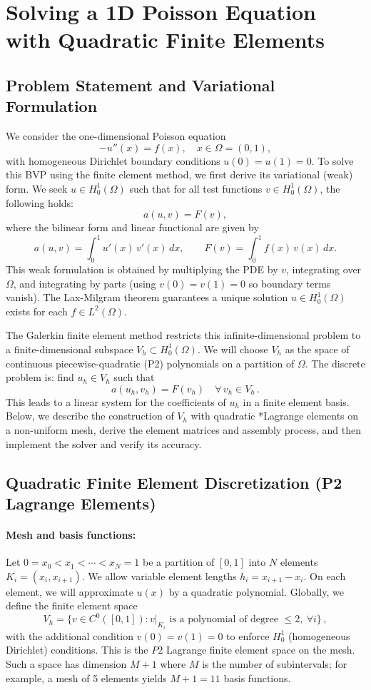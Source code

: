 \documentclass[a4paper,10pt]{article}
\begin{document}

\clearpage


\section{Solving a 1D Poisson Equation with Quadratic Finite Elements}

\subsection{Problem Statement and Variational Formulation}

We consider the one-dimensional Poisson equation
$$ 
-u''(x) = f(x), \quad x \in \Omega=(0,1), 
$$
with homogeneous Dirichlet boundary conditions $u(0)=u(1)=0$. 
To solve this BVP using the finite element method, we first derive its variational (weak) form. 
We seek $u \in H^1_0(\Omega)$ such that for all test functions $v \in H^1_0(\Omega)$, the following holds:
$$ 
a(u,v) = F(v), 
$$
where the bilinear form and linear functional are given by
$$ 
a(u,v) = \int_0^1 u'(x)\,v'(x)\,dx, \qquad F(v) = \int_0^1 f(x)\,v(x)\,dx. 
$$
This weak formulation is obtained by multiplying the PDE by $v$, integrating over $\Omega$, and integrating by parts (using $v(0)=v(1)=0$ so boundary terms vanish). The Lax-Milgram theorem guarantees a unique solution $u \in H^1_0(\Omega)$ exists for each $f\in L^2(\Omega)$.

The Galerkin finite element method restricts this infinite-dimensional problem to a finite-dimensional subspace $V_h \subset H^1_0(\Omega)$. We will choose $V_h$ as the space of continuous piecewise-quadratic (P2) polynomials on a partition of $\Omega$. The discrete problem is: find $u_h \in V_h$ such that
\[
a(u_h, v_h) = F(v_h) \quad \forall\, v_h \in V_h\,.\tag{*}
\]
This leads to a linear system for the coefficients of $u_h$ in a finite element basis. Below, we describe the construction of $V_h$ with quadratic *Lagrange\* elements on a non-uniform mesh, derive the element matrices and assembly process, and then implement the solver and verify its accuracy.

\subsection{Quadratic Finite Element Discretization (P2 Lagrange Elements)}

\paragraph{Mesh and basis functions:} 
Let $0 = x_0 < x_1 < \cdots < x_N = 1$ be a partition of $[0,1]$ into $N$ elements $K_i = (x_i, x_{i+1})$. 
We allow variable element lengths $h_i = x_{i+1}-x_i$. On each element, we will approximate $u(x)$ by a quadratic polynomial. Globally, we define the finite element space
$$ 
V_h = \{ v \in C^0([0,1]) : v|_{K_i} \text{ is a polynomial of degree }\le 2,\ \forall i\}\,, 
$$
with the additional condition $v(0)=v(1)=0$ to enforce $H^1_0$ (homogeneous Dirichlet) conditions.
This is the $P2$ Lagrange finite element space on the mesh. Such a space has dimension $M+1$ where $M$ is the number of subintervals; for example, a mesh of 5 elements yields $M+1=11$ basis functions.
\end{document}
